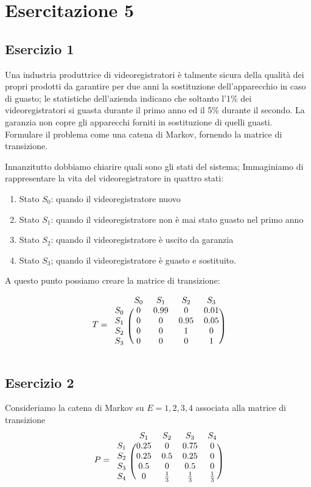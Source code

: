 \documentclass{article}
\begin{document}
	\section{Esercitazione 5}
	\subsection{Esercizio 1}

	Una industria produttrice di videoregistratori è talmente sicura della qualità dei propri prodotti da
	garantire per due anni la sostituzione dell’apparecchio in caso di guasto; le statistiche dell’azienda
	indicano che soltanto l’1\% dei videoregistratori si guasta durante il primo anno ed il 5\% durante il
	secondo. La garanzia non copre gli apparecchi forniti in sostituzione di quelli guasti. Formulare il
	problema come una catena di Markov, fornendo la matrice di transizione.
	
	Innanzitutto dobbiamo chiarire quali sono gli stati del sistema;
	Immaginiamo di rappresentare la vita del videoregistratore in quattro stati:
	\begin{enumerate}
		\item Stato $S_0$: quando il videoregistratore nuovo
		\item Stato $S_1$: quando il videoregistratore non è mai stato guasto nel primo anno
		\item Stato $S_2$: quando il videoregistratore è uscito da garanzia
		\item Stato $S_3$; quando il videoregistratore è guasto e sostituito.
	\end{enumerate}

A questo punto possiamo creare la matrice di transizione:

\[
T = 
\begin{blockarray}{ccccc}
	  & S_0 & S_1 & S_2 & S_3 \\
	\begin{block}{c(cccc)}
		S_0 & 0 & 0.99 & 0 & 0.01 \\
		S_1 & 0 & 0 & 0.95 & 0.05 \\
		S_2 & 0 & 0 & 1 & 0 \\
		S_3 & 0 & 0 & 0 & 1 \\
	\end{block}
\end{blockarray}
\]

	\subsection{Esercizio 2}
	Consideriamo la catena di Markov su 
	$E = {1,2,3,4}$ associata alla matrice di transizione
\[
P = 
\begin{blockarray}{ccccc}
	 & S_1 & S_2 & S_3 & S_4 \\
	\begin{block}{c(cccc)}
	 S_1 &	0.25 & 0   & 0.75 & 0 \\
	 S_2 &	0.25 & 0.5 & 0.25 & 0 \\
	 S_3 &	0.5  & 0   & 0.5  & 0 \\
	 S_4 &	0    & \frac{1}{3} &  \frac{1}{3} &  \frac{1}{3} \\
	\end{block}
\end{blockarray}
\]	
\end{document}
